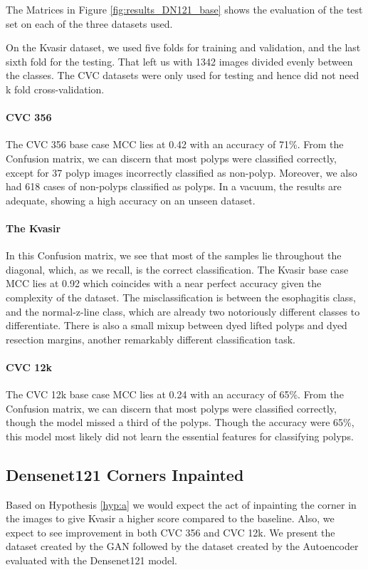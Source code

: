 \noindent
The Matrices in Figure \ref{fig:results_DN121_base} shows the evaluation of the test set on each of the three datasets used. 

On the Kvasir dataset, we used five folds for training and validation, and the last sixth fold for the testing. That left us with 1342 images divided evenly between the classes. The CVC datasets were only used for testing and hence did not need k fold cross-validation.

\paragraph{CVC 356}
The CVC 356 base case MCC lies at 0.42 with an accuracy of 71\%. 
From the Confusion matrix, we can discern that most polyps were classified correctly, except for 37 polyp images incorrectly classified as non-polyp. Moreover, we also had 618 cases of non-polyps classified as polyps.
In a vacuum, the results are adequate, showing a high accuracy on an unseen dataset.

\paragraph{The Kvasir}
In this Confusion matrix, we see that most of the samples lie throughout the diagonal, which, as we recall, is the correct classification. 
The Kvasir base case MCC lies at 0.92 which coincides with a near perfect accuracy given the complexity of the dataset. 
The misclassification is between the esophagitis class, and the normal-z-line class, which are already two notoriously different classes to differentiate.
There is also a small mixup between dyed lifted polyps and dyed resection margins, another remarkably different classification task. 


\paragraph{CVC 12k}
The CVC 12k base case MCC lies at 0.24 with an accuracy of 65\%. 
From the Confusion matrix, we can discern that most polyps were classified correctly, though the model missed a third of the polyps.
Though the accuracy were 65\%, this model most likely did not learn the essential features for classifying polyps.




\subsection{Densenet121 Corners Inpainted}
Based on Hypothesis \ref{hyp:a} we would expect the act of inpainting the corner in the images to give Kvasir a higher score compared to the baseline. Also, we expect to see improvement in both CVC 356 and CVC 12k.
We present the dataset created by the GAN followed by the dataset created by the Autoencoder evaluated with the Densenet121 model.

